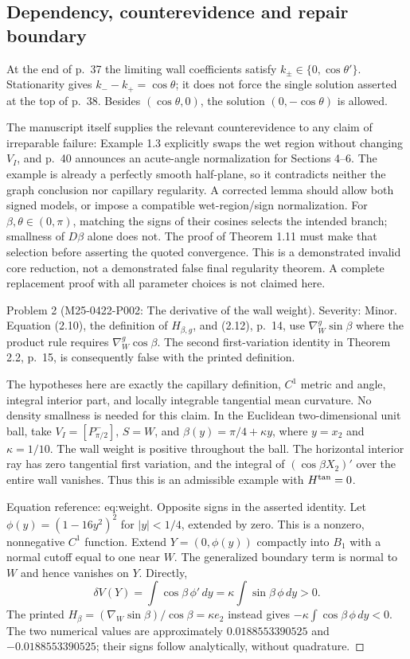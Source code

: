 \documentclass[10pt]{article}
\begin{document}
\subsection*{Dependency, counterevidence and repair boundary}
At the end of p. 37 the limiting wall coefficients satisfy \(k_\pm\in\{0,\cos\theta'\}\). Stationarity gives \(k_--k_+=\cos\theta\); it does not force the single solution asserted at the top of p. 38. Besides \((\cos\theta,0)\), the solution \((0,-\cos\theta)\) is allowed.\par
The manuscript itself supplies the relevant counterevidence to any claim of irreparable failure: Example 1.3 explicitly swaps the wet region without changing \(V_I\), and p. 40 announces an acute-angle normalization for Sections 4–6. The example is already a perfectly smooth half-plane, so it contradicts neither the graph conclusion nor capillary regularity. A corrected lemma should allow both signed models, or impose a compatible wet-region/sign normalization. For \(\beta,\theta\in(0,\pi)\), matching the signs of their cosines selects the intended branch; smallness of \(D\beta\) alone does not. The proof of Theorem 1.11 must make that selection before asserting the quoted convergence. This is a demonstrated invalid core reduction, not a demonstrated false final regularity theorem. A complete replacement proof with all parameter choices is not claimed here.\par
Problem 2 (M25-0422-P002: The derivative of the wall weight).  Severity: Minor. Equation (2.10), the definition of \(H_{\beta,g}\), and (2.12), p. 14, use \(\nabla_W^g\sin\beta\) where the product rule requires \(\nabla_W^g\cos\beta\). The second first-variation identity in Theorem 2.2, p. 15, is consequently false with the printed definition.\par
The hypotheses here are exactly the capillary definition, \(C^1\) metric and angle, integral interior part, and locally integrable tangential mean curvature. No density smallness is needed for this claim. In the Euclidean two-dimensional unit ball, take \(V_I=[P_{\pi/2}^-]\), \(S=W\), and \(\beta(y)=\pi/4+\kappa y\), where \(y=x_2\) and \(\kappa=1/10\). The wall weight is positive throughout the ball. The horizontal interior ray has zero tangential first variation, and the integral of \((\cos\beta X_2)'\) over the entire wall vanishes. Thus this is an admissible example with \(H^{\rm tan}=0\).\par
Equation reference: eq:weight. Opposite signs in the asserted identity. Let \(\phi(y)=(1-16y^2)^2\) for \(|y|<1/4\), extended by zero. This is a nonzero, nonnegative \(C^1\) function. Extend \(Y=(0,\phi(y))\) compactly into \(B_1\) with a normal cutoff equal to one near \(W\). The generalized boundary term is normal to \(W\) and hence vanishes on \(Y\). Directly, \[
 \delta V(Y)=\int\cos\beta\,\phi'\,dy
 =\kappa\int\sin\beta\,\phi\,dy>0.\] The printed \(H_\beta=(\nabla_W\sin\beta)/\cos\beta=\kappa e_2\) instead gives \(-\kappa\int\cos\beta\,\phi\,dy<0\). The two numerical values are approximately \(0.0188553390525\) and \(-0.0188553390525\); their signs follow analytically, without quadrature. ◻\par
\end{document}
